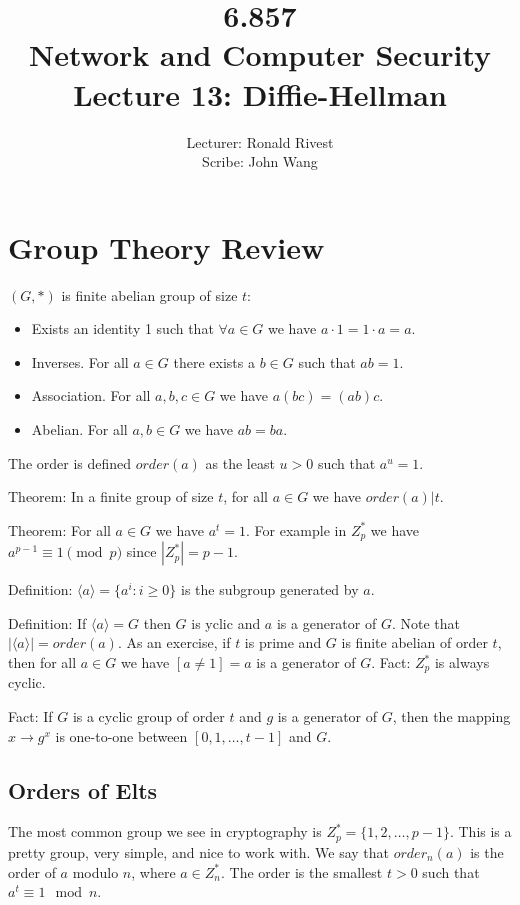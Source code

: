 \documentclass[psamsfonts]{amsart}
\title{6.857 \\
Network and Computer Security \\
Lecture 13: Diffie-Hellman}
\author{Lecturer: Ronald Rivest\\
Scribe: John Wang}
\begin{document}
\maketitle

\section{Group Theory Review}

$(G,*)$ is finite abelian group of size $t$:
\begin{itemize}
  \item Exists an identity 1 such that $\forall a \in G$ we have $a \cdot 1 = 1 \cdot a = a$.
  \item Inverses. For all $a \in G$ there exists a $b \in G$ such that $ab = 1$.
  \item Association. For all $a,b,c \in G$ we have $a (bc) = (ab) c$.
  \item Abelian. For all $a,b \in G$ we have $ab = ba$.
\end{itemize}

The order is defined $order(a)$ as the least $u > 0$ such that $a^u = 1$.

Theorem: In a finite group of size $t$, for all $a \in G$ we have $order(a) | t$.

Theorem: For all $a \in G$ we have $a^t = 1$. For example in $Z_p^*$ we have $a^{p-1} \equiv 1 \pmod{p}$ since $|Z_{p}^*| = p-1$.

Definition: $\langle a \rangle = \{a^i : i \geq 0\}$ is the subgroup generated by $a$.

Definition: If $\langle a \rangle = G$ then $G$ is yclic and $a$ is a generator of $G$. Note that $| \langle a \rangle | = order(a)$. As an exercise, if $t$ is prime and $G$ is finite abelian of order $t$, then for all $a \in G$ we have $[a \neq 1] = a$ is a generator of $G$. Fact: $Z_{p}^*$ is always cyclic.

Fact: If $G$ is a cyclic group of order $t$ and $g$ is a generator of $G$, then the mapping $x \to g^x$ is one-to-one between $[0,1, \ldots, t-1]$ and $G$.

\subsection{Orders of Elts}

The most common group we see in cryptography is $Z_{p}^* = \{1,2, \ldots, p-1 \}$. This is a pretty group, very simple, and nice to work with. We say that $order_{n}(a)$ is the order of $a$ modulo $n$, where $a \in Z_{n}^*$. The order is the smallest $t > 0$ such that $a^t \equiv 1 \mod n$.
\end{document}
